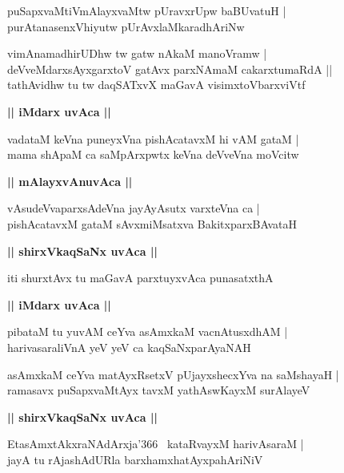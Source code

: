 \documentclass[twoside,12pt,openright]{book}
\newcounter{shloka}[chapter]
\def\uvaca#1{\centerline{{\large\textbf{#1}}}}
\begin{document}
\begin{shloka}%
puSapxvaMtiVmAlayxvaMtw pUravxrUpw baBUvatuH |\\
purAtanasenxVhiyutw pUrAvxlaMkaradhAriNw 
\end{shloka}

\begin{shloka}%
vimAnamadhirUDhw tw gatw nAkaM manoVramw |\\
deVveMdarxsAyxgarxtoV gatAvx parxNAmaM cakarxtumaRdA ||\\
tathAvidhw tu tw daqSATxvX maGavA visimxtoVbarxviVtf
\end{shloka}

\uvaca{|| iMdarx uvAca ||}

\begin{shloka}%
vadataM keVna puneyxVna pishAcatavxM hi vAM gataM |\\
mama shApaM ca saMpArxpwtx keVna deVveVna moVcitw
\end{shloka}

\uvaca{|| mAlayxvAnuvAca ||}

\begin{shloka}%
vAsudeVvaparxsAdeVna jayAyAsutx varxteVna ca |\\
pishAcatavxM gataM sAvxmiMsatxva BakitxparxBAvataH
\end{shloka}

\uvaca{|| shirxVkaqSaNx uvAca ||}

\begin{shloka}%
iti shurxtAvx tu maGavA parxtuyxvAca punasatxthA 
\end{shloka}

\uvaca{|| iMdarx uvAca ||}

\begin{shloka}%
pibataM tu yuvAM ceYva asAmxkaM vacnAtusxdhAM |\\
harivasaraliVnA yeV yeV ca kaqSaNxparAyaNAH
\end{shloka}

\begin{shloka}%
asAmxkaM ceYva matAyxRsetxV pUjayxshecxYva na saMshayaH |\\
ramasavx puSapxvaMtAyx tavxM yathAswKayxM surAlayeV
\end{shloka}

\uvaca{|| shirxVkaqSaNx uvAca ||}

\begin{shloka}%
EtasAmxtAkxraNAdArxja\char'366 ~kataRvayxM harivAsaraM |\\
jayA tu rAjashAdURla barxhamxhatAyxpahAriNiV
\end{shloka}
\end{document}
